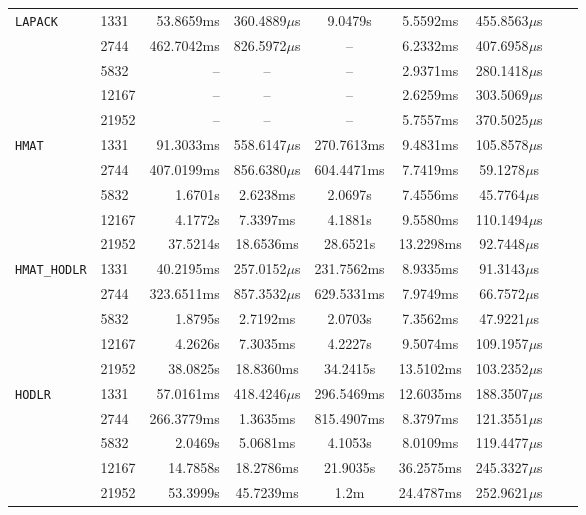 \documentclass[11pt,a4paper]{article}
\begin{document}
\begin{center}
\begin{longtable}{llrcccccc}
\texttt{LAPACK} & 1331 & 53.8659ms & 360.4889$\mu$s & 9.0479s & 5.5592ms & 455.8563$\mu$s\\
 & 2744 & 462.7042ms & 826.5972$\mu$s & -- & 6.2332ms & 407.6958$\mu$s\\
 & 5832 & -- & -- & -- & 2.9371ms & 280.1418$\mu$s\\
 & 12167 & -- & -- & -- & 2.6259ms & 303.5069$\mu$s\\
 & 21952 & -- & -- & -- & 5.7557ms & 370.5025$\mu$s\\
\texttt{HMAT} & 1331 & 91.3033ms & 558.6147$\mu$s & 270.7613ms & 9.4831ms & 105.8578$\mu$s\\
 & 2744 & 407.0199ms & 856.6380$\mu$s & 604.4471ms & 7.7419ms & 59.1278$\mu$s\\
 & 5832 & 1.6701s & 2.6238ms & 2.0697s & 7.4556ms & 45.7764$\mu$s\\
 & 12167 & 4.1772s & 7.3397ms & 4.1881s & 9.5580ms & 110.1494$\mu$s\\
 & 21952 & 37.5214s & 18.6536ms & 28.6521s & 13.2298ms & 92.7448$\mu$s\\
\texttt{HMAT\_HODLR} & 1331 & 40.2195ms & 257.0152$\mu$s & 231.7562ms & 8.9335ms & 91.3143$\mu$s\\
 & 2744 & 323.6511ms & 857.3532$\mu$s & 629.5331ms & 7.9749ms & 66.7572$\mu$s\\
 & 5832 & 1.8795s & 2.7192ms & 2.0703s & 7.3562ms & 47.9221$\mu$s\\
 & 12167 & 4.2626s & 7.3035ms & 4.2227s & 9.5074ms & 109.1957$\mu$s\\
 & 21952 & 38.0825s & 18.8360ms & 34.2415s & 13.5102ms & 103.2352$\mu$s\\
\texttt{HODLR} & 1331 & 57.0161ms & 418.4246$\mu$s & 296.5469ms & 12.6035ms & 188.3507$\mu$s\\
 & 2744 & 266.3779ms & 1.3635ms & 815.4907ms & 8.3797ms & 121.3551$\mu$s\\
 & 5832 & 2.0469s & 5.0681ms & 4.1053s & 8.0109ms & 119.4477$\mu$s\\
 & 12167 & 14.7858s & 18.2786ms & 21.9035s & 36.2575ms & 245.3327$\mu$s\\
 & 21952 & 53.3999s & 45.7239ms & 1.2m & 24.4787ms & 252.9621$\mu$s\\
\bottomrule\end{longtable}\end{center}
\end{document}

